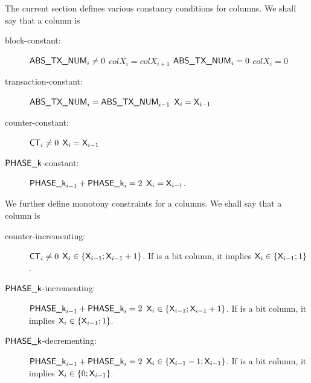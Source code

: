 The current section defines various constancy conditions for columns.
We shall say that a column  is
\begin{description}
	\item[block-constant:]
		\If $\textsf{ABS\_TX\_NUM}_{i} \ne 0$ \Then $col{X}_{i} = col{X}_{i + 1}$ \et \If $\textsf{ABS\_TX\_NUM}_{i} = 0$ \Then $col{X}_{i} = 0$
	\item[transaction-constant:]
		\If $\textsf{ABS\_TX\_NUM}_{i} = \textsf{ABS\_TX\_NUM}_{i-1}$ \Then $\textsf{X}_{i} = \textsf{X}_{i-1}$
	\item[counter-constant:]
		\If $\textsf{CT}_{i} \ne 0$ \Then $\textsf{X}_{i} = \textsf{X}_{i-1}$
	\item[$\textsf{PHASE\_k}$-constant:]
		\If $\textsf{PHASE\_k}_{i-1} + \textsf{PHASE\_k}_{i} = 2$ \Then $\textsf{X}_{i} = \textsf{X}_{i-1}$.
\end{description}
We further define monotony constraints for a columns.
We shall say that a column  is
\begin{description}
	\item[counter-incrementing:]
		\If $\textsf{CT}_{i} \ne 0$ \Then $\textsf{X}_{i} \in \{\textsf{X}_{i-1}; \textsf{X}_{i-1} + 1 \}$. If  is a bit column, it implies $\textsf{X}_{i} \in \{\textsf{X}_{i-1}; 1 \}$.
	\item[$\textsf{PHASE\_k}$-incrementing:]
		\If $\textsf{PHASE\_k}_{i-1} + \textsf{PHASE\_k}_{i} = 2$ \Then $\textsf{X}_{i} \in \{\textsf{X}_{i-1}; \textsf{X}_{i-1} + 1 \}$. If  is a bit column, it implies $\textsf{X}_{i} \in \{\textsf{X}_{i-1}; 1 \}$.
	\item[$\textsf{PHASE\_k}$-decrementing:]
		\If $\textsf{PHASE\_k}_{i-1} + \textsf{PHASE\_k}_{i} = 2$ \Then $\textsf{X}_{i} \in \{\textsf{X}_{i-1} -1; \textsf{X}_{i-1} \}$. If  is a bit column, it implies $\textsf{X}_{i} \in \{0 ; \textsf{X}_{i-1}\}$.
\end{description}

